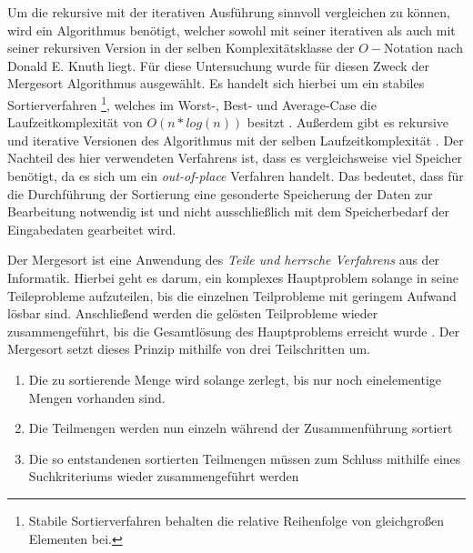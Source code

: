 Um die rekursive mit der iterativen Ausführung  sinnvoll vergleichen zu können, wird ein Algorithmus benötigt, welcher sowohl mit seiner iterativen als auch mit seiner rekursiven Version in der selben Komplexitätsklasse  der $O-$Notation nach  Donald E. Knuth liegt. Für diese Untersuchung wurde für diesen Zweck der Mergesort Algorithmus ausgewählt. Es handelt sich hierbei um ein stabiles Sortierverfahren \footnote{Stabile Sortierverfahren behalten die relative Reihenfolge von gleichgroßen Elementen bei.}, welches im Worst-, Best- und Average-Case die Laufzeitkomplexität von $O(n*log(n))$ besitzt \cite[96]{AlgorithmenDatenstrukturen}. Außerdem gibt es rekursive und iterative Versionen des Algorithmus mit der selben Laufzeitkomplexität \cite[134 f.]{AlgorithmenJurgen}. Der Nachteil des hier verwendeten Verfahrens ist, dass es vergleichsweise viel Speicher benötigt, da es sich um ein \emph{out-of-place} Verfahren handelt. Das bedeutet, dass für die Durchführung der Sortierung eine gesonderte Speicherung der Daten zur Bearbeitung notwendig ist und nicht ausschließlich mit dem Speicherbedarf der Eingabedaten gearbeitet wird.

Der Mergesort ist eine Anwendung des \emph{Teile und herrsche Verfahrens} aus der Informatik. Hierbei geht es darum, ein komplexes Hauptproblem solange in seine Teileprobleme aufzuteilen, bis die einzelnen Teilprobleme mit geringem Aufwand lösbar sind. Anschließend werden die gelösten Teilprobleme wieder zusammengeführt, bis die Gesamtlösung des Hauptproblems erreicht wurde \cite[9]{AlgorithmenDatenstrukturen}. Der Mergesort setzt dieses Prinzip mithilfe von drei Teilschritten um.
\begin{enumerate}
\item Die zu sortierende Menge wird solange zerlegt, bis nur noch einelementige Mengen vorhanden sind.
\item Die Teilmengen werden nun einzeln während der Zusammenführung sortiert
\item Die so entstandenen sortierten Teilmengen müssen zum Schluss mithilfe eines Suchkriteriums wieder zusammengeführt werden 
\end{enumerate}

